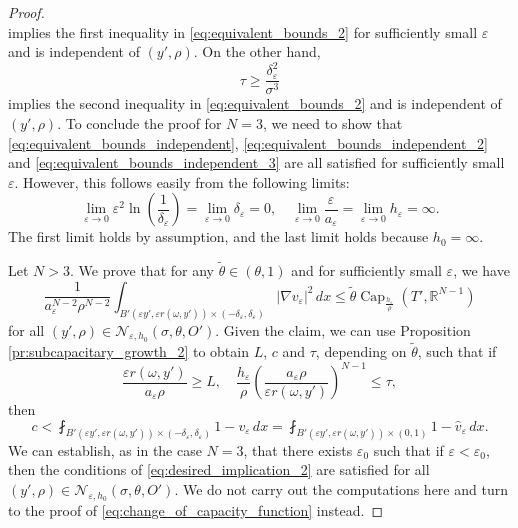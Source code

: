 \documentclass[10pt,a4paper]{amsart}
\newcommand{\cpct}{\operatorname{Cap}}
\begin{document}
\begin{proof}
\begin{equation}
    \end{equation}
    implies the first inequality in \eqref{eq:equivalent_bounds_2} for sufficiently small $\varepsilon$ and is independent of $(y', \rho)$. On the other hand,
    \begin{equation} \label{eq:equivalent_bounds_independent_3}
        \tau \ge \frac{\delta_\varepsilon^2}{\sigma^3}
    \end{equation}
    implies the second inequality in \eqref{eq:equivalent_bounds_2} and is independent of $(y', \rho)$. To conclude the proof for $N = 3$, we need to show that \eqref{eq:equivalent_bounds_independent}, \eqref{eq:equivalent_bounds_independent_2} and \eqref{eq:equivalent_bounds_independent_3} are all satisfied for sufficiently small $\varepsilon$. However, this follows easily from the following limits:
    \[
    \lim_{\varepsilon \to 0} \varepsilon^2 \ln\left(\frac{1}{\delta_\varepsilon}\right) = \lim_{\varepsilon \to 0} \delta_\varepsilon = 0, \quad \lim_{\varepsilon \to 0} \frac{\varepsilon}{a_\varepsilon} = \lim_{\varepsilon \to 0} h_\varepsilon = \infty.
    \]
    The first limit holds by assumption, and the last limit holds because $h_0 = \infty$.

    Let $N > 3$. We prove that for any $\tilde{\theta} \in (\theta, 1)$ and for sufficiently small $\varepsilon$, we have
    \begin{equation} \label{eq:change_of_capacity_function}
        \frac{1}{a_\varepsilon^{N - 2} \rho^{N - 2}} \int_{B'(\varepsilon y', \varepsilon r(\omega, y')) \times (-\delta_\varepsilon, \delta_\varepsilon)} |\nabla v_\varepsilon|^2 \, dx \le \tilde{\theta} \cpct_{\frac{h_\varepsilon}{\rho}}(T', \mathbb{R}^{N - 1})
    \end{equation}
    for all $(y', \rho) \in \mathcal{N}_{\varepsilon, h_0}(\sigma, \theta, O')$. Given the claim, we can use Proposition \ref{pr:subcapacitary_growth_2} to obtain $L$, $c$ and $\tau$, depending on $\tilde{\theta}$, such that if
    \begin{equation} \label{eq:desired_implication_2}
        \frac{\varepsilon r(\omega, y')}{a_\varepsilon \rho} \ge L, \quad \frac{h_\varepsilon}{\rho} \left(\frac{a_\varepsilon \rho}{\varepsilon r(\omega, y')}\right)^{N - 1} \le \tau,
    \end{equation}
    then
    \[
    c < \fint_{B'(\varepsilon y', \varepsilon r(\omega, y')) \times (-\delta_\varepsilon, \delta_\varepsilon)} 1 - v_\varepsilon \, dx = \fint_{B'(\varepsilon y', \varepsilon r(\omega, y')) \times (0, 1)} 1 - \hat{v}_\varepsilon \, dx.
    \]
    We can establish, as in the case $N = 3$, that there exists $\varepsilon_0$ such that if $\varepsilon < \varepsilon_0$, then the conditions of \eqref{eq:desired_implication_2} are satisfied for all $(y', \rho) \in \mathcal{N}_{\varepsilon, h_0}(\sigma, \theta, O')$. We do not carry out the computations here and turn to the proof of \eqref{eq:change_of_capacity_function} instead.


\end{proof}
\end{document}
